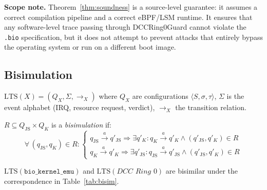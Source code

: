 \documentclass[11pt,a4paper,twoside]{article}
\begin{document}
\begin{mdframed}[style=notebox]
\textbf{Scope note.} Theorem~\ref{thm:soundness} is a source-level guarantee: it
assumes a correct compilation pipeline and a correct eBPF/LSM runtime. It ensures
that any software-level trace passing through DCCRing0Guard cannot violate the
\texttt{.bio} specification, but it does not attempt to prevent attacks that entirely
bypass the operating system or run on a different boot image.
\end{mdframed}

\subsection{Bisimulation}

\begin{definition}[LTS]\label{def:lts}
$\mathrm{LTS}(X) = (Q_X, \Sigma, {\to_X})$ where $Q_X$ are configurations
$\langle S,\sigma,\tau\rangle$, $\Sigma$ is the event alphabet (IRQ, resource
request, verdict), ${\to_X}$ the transition relation.
\end{definition}

\begin{definition}[Bisimulation]\label{def:bisim}
$R \subseteq Q_\mathrm{JS} \times Q_K$ is a \emph{bisimulation} if:
\[
\forall\,(q_\mathrm{JS},q_K)\in R:\begin{cases}
  q_\mathrm{JS}\xrightarrow{a}q'_\mathrm{JS} \Rightarrow \exists q'_K: q_K\xrightarrow{a}q'_K \wedge (q'_\mathrm{JS},q'_K)\in R \\
  q_K\xrightarrow{a}q'_K \Rightarrow \exists q'_\mathrm{JS}: q_\mathrm{JS}\xrightarrow{a}q'_\mathrm{JS} \wedge (q'_\mathrm{JS},q'_K)\in R
\end{cases}
\]
\end{definition}

\begin{theorem}\label{thm:bisim}
$\mathrm{LTS}(\texttt{bio\_kernel\_emu})$ and $\mathrm{LTS}(\textit{DCC Ring~0})$
are bisimilar under the correspondence in Table~\ref{tab:bisim}.
\end{theorem}
\end{document}
